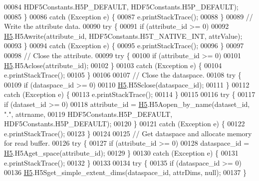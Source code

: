 \begin{DoxyCode}
00084                         HDF5Constants.H5P\_DEFAULT, HDF5Constants.H5P\_DEFAULT);
00085         \}
00086         \textcolor{keywordflow}{catch} (Exception e) \{
00087             e.printStackTrace();
00088         \}
00089         \textcolor{comment}{// Write the attribute data.}
00090         \textcolor{keywordflow}{try} \{
00091             \textcolor{keywordflow}{if} (attribute\_id >= 0)
00092                 \hyperlink{namespace_h5}{H5}.H5Awrite(attribute\_id, HDF5Constants.H5T\_NATIVE\_INT, attrValue);
00093         \}
00094         \textcolor{keywordflow}{catch} (Exception e) \{
00095             e.printStackTrace();
00096         \}
00097 
00098         \textcolor{comment}{// Close the attribute.}
00099         \textcolor{keywordflow}{try} \{
00100             \textcolor{keywordflow}{if} (attribute\_id >= 0)
00101                 \hyperlink{namespace_h5}{H5}.H5Aclose(attribute\_id);
00102         \}
00103         \textcolor{keywordflow}{catch} (Exception e) \{
00104             e.printStackTrace();
00105         \}
00106 
00107         \textcolor{comment}{// Close the dataspace.}
00108         \textcolor{keywordflow}{try} \{
00109             \textcolor{keywordflow}{if} (dataspace\_id >= 0)
00110                 \hyperlink{namespace_h5}{H5}.H5Sclose(dataspace\_id);
00111         \}
00112         \textcolor{keywordflow}{catch} (Exception e) \{
00113             e.printStackTrace();
00114         \}
00115 
00116         \textcolor{keywordflow}{try} \{
00117             \textcolor{keywordflow}{if} (dataset\_id >= 0)
00118                 attribute\_id = \hyperlink{namespace_h5}{H5}.H5Aopen\_by\_name(dataset\_id, \textcolor{stringliteral}{"."}, attrname,
00119                         HDF5Constants.H5P\_DEFAULT, HDF5Constants.H5P\_DEFAULT);
00120         \}
00121         \textcolor{keywordflow}{catch} (Exception e) \{
00122             e.printStackTrace();
00123         \}
00124 
00125         \textcolor{comment}{// Get dataspace and allocate memory for read buffer.}
00126         \textcolor{keywordflow}{try} \{
00127             \textcolor{keywordflow}{if} (attribute\_id >= 0)
00128                 dataspace\_id = \hyperlink{namespace_h5}{H5}.H5Aget\_space(attribute\_id);
00129         \}
00130         \textcolor{keywordflow}{catch} (Exception e) \{
00131             e.printStackTrace();
00132         \}
00133 
00134         \textcolor{keywordflow}{try} \{
00135             \textcolor{keywordflow}{if} (dataspace\_id >= 0)
00136                 \hyperlink{namespace_h5}{H5}.H5Sget\_simple\_extent\_dims(dataspace\_id, attrDims, null);
00137         \}

\end{DoxyCode}
